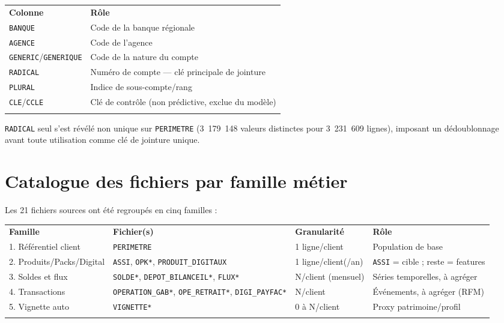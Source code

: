 \documentclass[11pt,a4paper]{report}
\let\oldtoprule\toprule
\renewcommand{\toprule}{\arrayrulecolor{corpslate}\oldtoprule\arrayrulecolor{black}}
\let\oldmidrule\midrule
\renewcommand{\midrule}{\arrayrulecolor{emsigreen}\oldmidrule\arrayrulecolor{black}}
\let\oldbottomrule\bottomrule
\renewcommand{\bottomrule}{\arrayrulecolor{corpslate}\oldbottomrule\arrayrulecolor{black}}
\begin{document}
\begin{center}
\begin{tabular}{@{}ll@{}}
\toprule
\rowcolor{corpslate!10}
\textbf{Colonne} & \textbf{Rôle} \\
\midrule
\texttt{BANQUE} & Code de la banque régionale \\
\texttt{AGENCE} & Code de l'agence \\
\texttt{GENERIC}/\texttt{GENERIQUE} & Code de la nature du compte \\
\rowcolor{bcporange!10} \texttt{RADICAL} & Numéro de compte — clé principale de jointure \\
\texttt{PLURAL} & Indice de sous-compte/rang \\
\texttt{CLE}/\texttt{CCLE} & Clé de contrôle (non prédictive, exclue du modèle) \\
\bottomrule
\end{tabular}
\end{center}

\texttt{RADICAL} seul s'est révélé non unique sur \texttt{PERIMETRE}
(3~179~148 valeurs distinctes pour 3~231~609 lignes), imposant un
dédoublonnage avant toute utilisation comme clé de jointure unique.


\section{Catalogue des fichiers par famille métier}
Les 21 fichiers sources ont été regroupés en cinq familles :

\begin{center}
\begin{tabular}{@{}p{3.2cm}p{4.6cm}p{2.4cm}p{3.4cm}@{}}
\toprule
\rowcolor{corpslate!10}
\textbf{Famille} & \textbf{Fichier(s)} & \textbf{Granularité} & \textbf{Rôle} \\
\midrule
1. Référentiel client & \texttt{PERIMETRE} & 1 ligne/client & Population de base \\
2. Produits/Packs/Digital & \texttt{ASSI}, \texttt{OPK*}, \texttt{PRODUIT\_DIGITAUX} & 1 ligne/client(/an) & \texttt{ASSI} = cible ; reste = features \\
3. Soldes et flux & \texttt{SOLDE*}, \texttt{DEPOT\_BILANCEIL*}, \texttt{FLUX*} & N/client (mensuel) & Séries temporelles, à agréger \\
4. Transactions & \texttt{OPERATION\_GAB*}, \texttt{OPE\_RETRAIT*}, \texttt{DIGI\_PAYFAC*} & N/client & Événements, à agréger (RFM) \\
5. Vignette auto & \texttt{VIGNETTE*} & 0 à N/client & Proxy patrimoine/profil \\
\bottomrule
\end{tabular}
\end{center}
\end{document}
